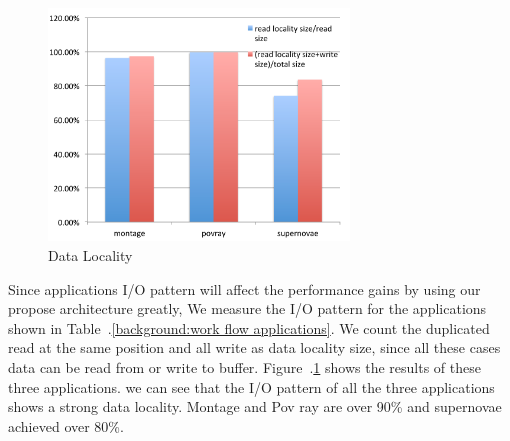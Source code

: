 \begin{figure}
\centering
\includegraphics[width=8cm]{img/data_locality.pdf}
\caption{Data Locality}
\label{background:data locality}
\end{figure}

Since applications I/O pattern will affect the performance gains by using our propose architecture
greatly, We measure the I/O pattern for the applications shown in Table~.\ref{background:work flow
applications}.
We count the duplicated read at the same position and all write as data locality size, since all
these cases data can be read from or write to buffer.
Figure~.\ref{background:data locality} shows the results of these three applications. we can see
that the I/O pattern of all the three applications shows a strong data locality. Montage and Pov ray
are over 90\% and supernovae achieved over 80\%.


